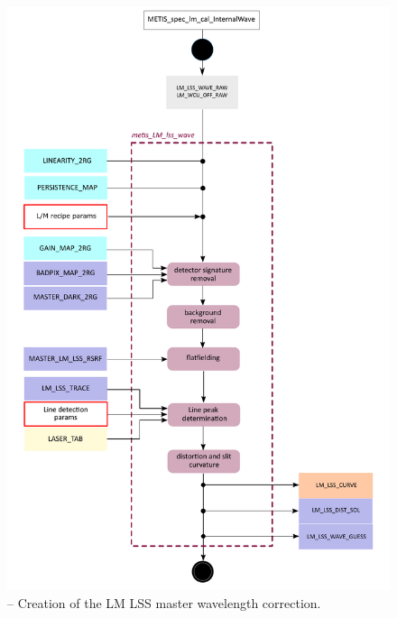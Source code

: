 \begin{figure}[ht]
  \centering
  \includegraphics[width=0.5\textheight]{figures/metis_lm_lss_wave_v0.84.pdf}
  \caption[Recipe: ]{ --
    Creation of the LM LSS master wavelength correction.}
  \label{Fig:rec_lm_lss_trace}
\end{figure}
\clearpage


